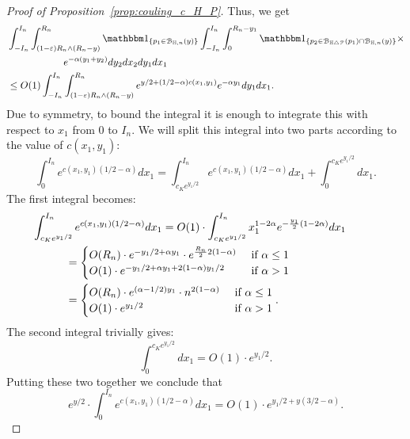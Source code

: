 \begin{proof}[Proof of Proposition~\ref{prop:couling_c_H_P}]
Thus, we get
\begin{align*}
	&\int_{-I_n}^{I_n} \int_{(1-\eps) R_n \wedge (R_n-y)}^{R_n} \ind{p_1 \in \BallHyp{y}}
		\int_{-I_n}^{I_n} \int_{0}^{R_n-y_1} 
		\ind{p_2 \in \BallSym{p_1} \cap \BallHyp{y}} \times \\ 
	& \hspace{2cm}  e^{-\alpha(y_1 + y_2)} dy_2 dx_2 dy_1 dx_1 \\
	&\leq O(1) \int_{-I_n}^{I_n} \int_{(1-\eps) R_n \wedge (R_n-y)}^{R_n} 
		e^{y/2 + (1/2 -\alpha) c(x_1,y_1)} e^{-\alpha y_1} dy_1 dx_1. 
\end{align*}
Due to symmetry, to bound the integral it is enough to integrate this with respect to $x_1$ from 0 to $I_n$.
We will split this integral into two parts according to the value of $c(x_1,y_1)$:
\[
	\int_0^{I_n} e^{c(x_1,y_1) (1/2 -\alpha)} dx_1 = 
	\int_{c_K e^{y_1/2}}^{I_n} e^{c(x_1,y_1) (1/2 -\alpha)} dx_1 + \int_0^{c_K e^{y_1/2}} dx_1.
\]
The first integral becomes: 
\begin{align*}
	&\hspace{-30pt}\int_{c_K e^{y_1/2}}^{I_n} e^{c(x_1,y_1) (1/2 -\alpha)} dx_1  = 
 		O(1)\cdot \int_{c_K e^{y_1/2}}^{I_n} x_1^{1 -2\alpha} 
		e^{-\frac{y_1}{2} (1-2\alpha)} dx_1 \\
	&= \begin{cases}
		O(R_n) \cdot e^{-y_1/2 + \alpha y_1} \cdot e^{\frac{R_n}{2} 2(1-\alpha)} & \ \mbox{if $\alpha \leq 1$}\\
		O(1) \cdot e^{-y_1/2 + \alpha y_1 + 2(1-\alpha)y_1/2} & \ \mbox{if $\alpha > 1$}
		\end{cases}\\
	&=\begin{cases}
		O(R_n) \cdot e^{(\alpha -1/2) y_1} \cdot n^{2(1-\alpha)} & \ \mbox{if $\alpha \leq 1$}\\
		O(1) \cdot e^{y_1/2} &\ \mbox{if $\alpha > 1$}
	\end{cases}.  
\end{align*}
The second integral trivially gives: 
\[
	\int_0^{c_K e^{y_1/2}} dx_1 = O(1) \cdot e^{y_1/2}.
\]
Putting these two together we conclude that 
\[
	e^{y/2} \cdot \int_0^{I_n} e^{c(x_1,y_1) (1/2 -\alpha)} dx_1
	= O(1) \cdot e^{y_1/2 +y(3/2-\alpha)}.
\]


\end{proof}
